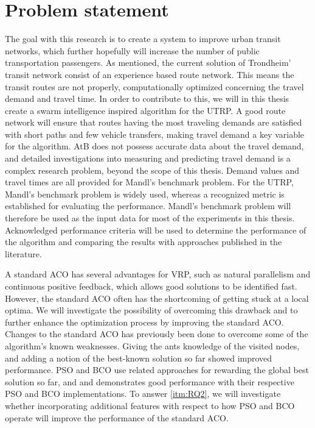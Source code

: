 \section{Problem statement}
\label{subsec:problemStatement}

The goal with this research is to create a system to improve urban transit networks, which further hopefully will increase the number of public transportation passengers. As mentioned, the current solution of Trondheim' transit network consist of an experience based route network. This means the transit routes are not properly, computationally optimized concerning the travel demand and travel time. In order to contribute to this, we will in this thesis create a swarm intelligence inspired algorithm for the UTRP. A good route network will ensure that routes having the most traveling demands are satisfied with short paths and few vehicle transfers, making travel demand a key variable for the algorithm. AtB\citep{website:atb} does not possess accurate data about the travel demand, and detailed investigations into measuring and predicting travel demand is a complex research problem, beyond the scope of this thesis. Demand values and travel times are all provided for Mandl's benchmark problem\citep{mandl79}. For the UTRP, Mandl's benchmark problem is widely used, whereas a recognized metric is established for evaluating the performance. Mandl's benchmark problem will therefore be used as the input data for most of the experiments in this thesis. Acknowledged performance criteria will be used to determine the performance of the algorithm and comparing the results with approaches published in the literature\citep{nikolic14,kechagiopoulos14,mandl79,kidwai98, fan10, chakroborty02, zhang10, chew12}.

A standard ACO has several advantages for VRP, such as natural parallelism and continuous positive feedback, which allows good solutions to be identified fast. However, the standard ACO often has the shortcoming  of getting stuck at a local optima. We will investigate the possibility of overcoming this drawback and to further enhance the optimization process by improving the standard ACO. Changes to the standard ACO has previously been done to overcome some of the algorithm's known weaknesses. Giving the ants knowledge of the visited nodes\citep{sedighpour14,salehinejad10,poorzahedy11}, and adding a notion of the best-known solution so far\citep{tripathi09,sedighpour14} showed improved performance. PSO and BCO use related approaches for rewarding the global best solution so far, and \citet{kechagiopoulos14} and \citet{nikolic14} demonstrates good performance with their respective PSO and BCO implementations. To answer \vref{itm:RQ2}, we will investigate whether incorporating additional features with respect to how PSO and BCO operate will improve the performance of the standard ACO.

